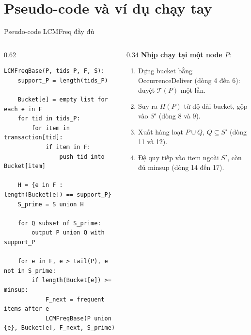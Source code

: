 \documentclass[9pt, aspectratio=169]{beamer}
\begin{document}
\section{Pseudo-code và ví dụ chạy tay}
\begin{frame}[fragile]{Pseudo-code LCMFreq đầy đủ}
  \begin{columns}[T,onlytextwidth]
    \begin{column}{0.62\textwidth}
\begin{lstlisting}
LCMFreqBase(P, tids_P, F, S):
    support_P = length(tids_P)

    Bucket[e] = empty list for each e in F
    for tid in tids_P:
        for item in transaction[tid]:
            if item in F:
                push tid into Bucket[item]

    H = {e in F : length(Bucket[e]) == support_P}
    S_prime = S union H

    for Q subset of S_prime:
        output P union Q with support_P

    for e in F, e > tail(P), e not in S_prime:
        if length(Bucket[e]) >= minsup:
            F_next = frequent items after e
            LCMFreqBase(P union {e}, Bucket[e], F_next, S_prime)
\end{lstlisting}
    \end{column}

    \begin{column}{0.34\textwidth}
      \small
      \textbf{Nhịp chạy tại một node $P$}:
      \begin{enumerate}
        \item Dựng bucket bằng OccurrenceDeliver (dòng 4 đến 6): duyệt
          $\mathcal T(P)$ một lần.
        \item Suy ra $H(P)$ từ độ dài bucket, gộp vào $S'$ (dòng 8 và 9).
        \item Xuất hàng loạt $P\cup Q$, $Q\subseteq S'$ (dòng 11 và 12).
        \item Đệ quy tiếp vào item ngoài $S'$, còn đủ minsup (dòng 14 đến 17).
      \end{enumerate}
    \end{column}
  \end{columns}
\end{frame}
\end{document}
